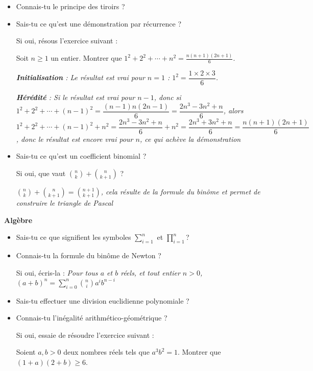 \begin{itemize}
\item Connais-tu le principe des tiroirs ? \qquad {}  \qquad {}
\item Sais-tu ce qu'est une démonstration par récurrence ?  \qquad {}  \qquad {}


Si oui, résous l'exercice suivant :

Soit $n \geq 1$ un entier. Montrer que $1^2+2^2+ \cdots +n^2=\frac{n(n+1)(2n+1)}{6}$.

\bigskip

\emph{\textbf{Initialisation} : Le résultat est vrai pour $n = 1$ : $1^2 = \dfrac{1 \times 2 \times 3 }{6}$. }

\smallskip

\emph{\textbf{Hérédité} : Si le résultat est vrai pour $n-1$, donc si $1^2+2^2+\cdots+(n-1)^2 = \dfrac{(n-1)n(2n-1)}{6} = \dfrac{2n^3-3n^2+n}{6}$, alors $1^2 + 2^2 + \cdots + (n-1)^2 + n^2 = \dfrac{2n^3 - 3n^2 + n}{6} + n^2 = \dfrac{2n^3 + 3n^2 + n}{6} = \dfrac{n(n+1)(2n+1)}{6}$, donc le résultat est encore vrai pour $n$, ce qui achève la démonstration}

\bigskip


\item
Sais-tu ce qu'est un coefficient binomial ?


Si oui, que vaut ${n \choose k} +{n \choose k+1}$ ?

\bigskip
\emph{${n \choose k} +{n \choose k+1} = {n+1 \choose k+1}$, cela résulte de la formule du binôme et permet de construire le triangle de Pascal}

\end{itemize}

\bigskip
{\Large\textbf{Algèbre}}
\bigskip

\begin{itemize}

\item Sais-tu ce que signifient  les symboles $\displaystyle \sum_{i=1}^{n}$ et $\displaystyle\prod_{i=1}^{n}$?  \qquad {}  \qquad {}

\item Connais-tu la formule du binôme de Newton ?  \qquad {}  \qquad {}

Si oui, écris-la :
\bigskip
\emph{Pour tous $a$ et $b$ réels, et tout entier $n > 0$, $(a+b)^n = \displaystyle \sum_{i=0}^{n} {n \choose i}a^ib^{n-i} $}

\bigskip
\item
Sais-tu effectuer une division euclidienne polynomiale ? \qquad {}  \qquad {}

\item
Connais-tu l'inégalité arithmético-géométrique ? \qquad {}  \qquad {}

Si oui, essaie de résoudre l'exercice suivant :

Soient $a,b>0$ deux nombres réels tels que $a^3b^2=1$. Montrer que $(1+a)(2+b)\geq 6$.
\end{itemize}

